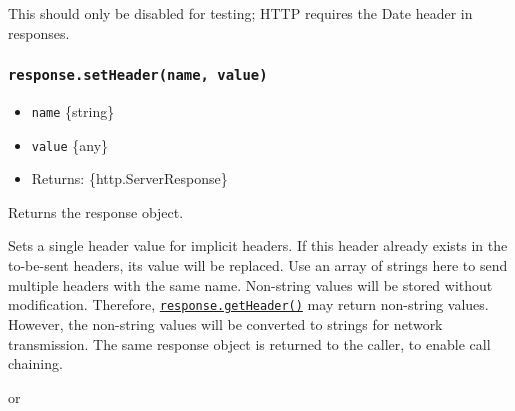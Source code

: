 This should only be disabled for testing; HTTP requires the Date header
in responses.

\subsubsection{\texorpdfstring{\texttt{response.setHeader(name,\ value)}}{response.setHeader(name, value)}}\label{response.setheadername-value}

\begin{itemize}
\tightlist
\item
  \texttt{name} \{string\}
\item
  \texttt{value} \{any\}
\item
  Returns: \{http.ServerResponse\}
\end{itemize}

Returns the response object.

Sets a single header value for implicit headers. If this header already
exists in the to-be-sent headers, its value will be replaced. Use an
array of strings here to send multiple headers with the same name.
Non-string values will be stored without modification. Therefore,
\hyperref[responsegetheadername]{\texttt{response.getHeader()}} may
return non-string values. However, the non-string values will be
converted to strings for network transmission. The same response object
is returned to the caller, to enable call chaining.

\begin{Shaded}
\begin{Highlighting}[]
\NormalTok{(}\OperatorTok{,} \NormalTok{)}\OperatorTok{;}
\end{Highlighting}
\end{Shaded}

or

\begin{Shaded}
\begin{Highlighting}[]
\NormalTok{(}\OperatorTok{,}\NormalTok{ [}\OperatorTok{,} \NormalTok{])}\OperatorTok{;}
\end{Highlighting}
\end{Shaded}

